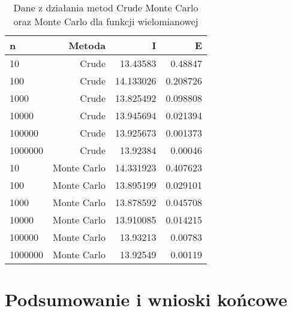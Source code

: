 \documentclass[12pt,twoside]{article}
\begin{document}
\begin{table}[H]
\centering 
\caption{Dane z działania metod Crude Monte Carlo oraz Monte Carlo dla funkcji wielomianowej}
\label{tabela9.7}
\begin{tabular}{lrrr}
\toprule
{n} & Metoda &  I &  E \\
\midrule
10  &     Crude & 13.43583  &   0.48847 \\
100  &     Crude & 14.133026 &   0.208726 \\
1000  &    Crude & 13.825492  &   0.098808  \\
10000  &    Crude & 13.945694  &   0.021394  \\
100000  &    Crude & 13.925673 &    0.001373   \\
1000000  &    Crude & 13.92384 &    0.00046   \\
\midrule
10  &     Monte Carlo & 14.331923  &   0.407623 \\
100  &     Monte Carlo & 13.895199 &   0.029101\\
1000  &    Monte Carlo & 13.878592   &   0.045708  \\
10000  &    Monte Carlo & 13.910085  &   0.014215  \\
100000  &    Monte Carlo & 13.93213 &    0.00783   \\
1000000  &    Monte Carlo & 13.92549 &    0.00119   \\
\bottomrule
\end{tabular}
\end{table}


\section{Podsumowanie i wnioski końcowe}
\end{document}
